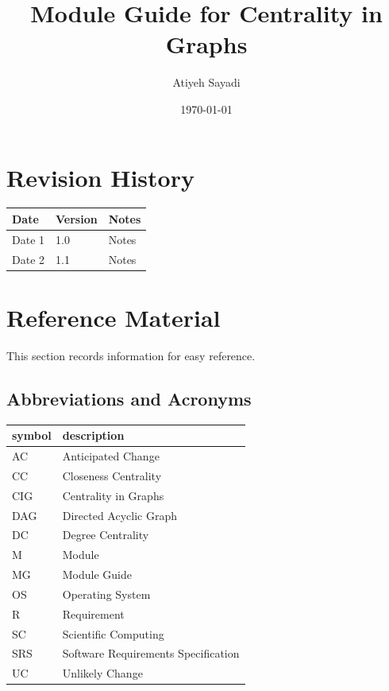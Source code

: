 \documentclass[12pt, titlepage]{article}
\begin{document}
\title{Module Guide for Centrality in Graphs} 
\author{Atiyeh Sayadi}
\date{\today}

\maketitle


\section{Revision History}

\begin{tabularx}{\textwidth}{p{3cm}p{2cm}X}
\toprule {\bf Date} & {\bf Version} & {\bf Notes}\\
\midrule
Date 1 & 1.0 & Notes\\
Date 2 & 1.1 & Notes\\
\bottomrule
\end{tabularx}

\newpage

\section{Reference Material}

This section records information for easy reference.

\subsection{Abbreviations and Acronyms}

\renewcommand{\arraystretch}{1.2}
\begin{tabular}{l l} 
  \toprule		
  \textbf{symbol} & \textbf{description}\\
  \midrule 
  AC & Anticipated Change\\
CC & Closeness Centrality\\
  CIG& Centrality in Graphs\\
  DAG & Directed Acyclic Graph \\
DC & Degree Centrality\\
  M & Module \\
  MG & Module Guide \\
  OS & Operating System \\
  R & Requirement\\
  SC & Scientific Computing \\
  SRS & Software Requirements Specification\\
  UC & Unlikely Change \\
  \bottomrule
\end{tabular}\\
\end{document}
